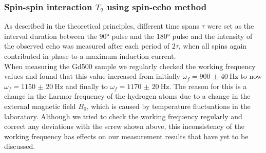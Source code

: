 \subsubsection{Spin-spin interaction $T_2$ using spin-echo method}
As described in the theoretical principles, different time spans $\tau$ were set as the interval duration between the $\ang{90}$ pulse and the $\ang{180}$ pulse and the intensity of the observed echo was measured after each period of $2\tau$, when all spins again contributed in phase to a maximum induction current.\\
When measuring the Gd500 sample we regularly checked the working frequency values and found that this value increased from initially $\omega_f=\SI{900(40)}{\hertz}$ to now $\omega_f=\SI{1150(20)}{\hertz}$ and finally to $\omega_f=\SI{1170(20)}{\hertz}$.
The reason for this is a change in the Larmor frequency of the hydrogen atoms due to a change in the external magnetic field $B_0$, which is caused by temperature fluctuations in the laboratory.
Although we tried to check the working frequency regularly and correct any deviations with the screw shown above, this inconsistency of the working frequency has effects on our measurement results that have yet to be discussed.\\

